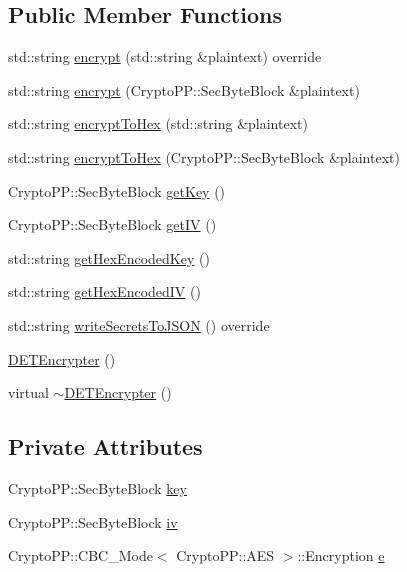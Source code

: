 \subsection*{Public Member Functions}
\begin{DoxyCompactItemize}
\item 
std\+::string \hyperlink{classDETEncrypter_a9d628bff7fe333ece3c39f3827727582}{encrypt} (std\+::string \&plaintext) override
\item 
std\+::string \hyperlink{classDETEncrypter_a0755264964442bb1593cf1ffd0bbe274}{encrypt} (Crypto\+P\+P\+::\+Sec\+Byte\+Block \&plaintext)
\item 
std\+::string \hyperlink{classDETEncrypter_ad688722b05535c623af3c32548af23c9}{encrypt\+To\+Hex} (std\+::string \&plaintext)
\item 
std\+::string \hyperlink{classDETEncrypter_a78128a4a9df72a4199abbd06f6169c48}{encrypt\+To\+Hex} (Crypto\+P\+P\+::\+Sec\+Byte\+Block \&plaintext)
\item 
Crypto\+P\+P\+::\+Sec\+Byte\+Block \hyperlink{classDETEncrypter_aa8b1e2a9a97067e338eaf5f4b6093db9}{get\+Key} ()
\item 
Crypto\+P\+P\+::\+Sec\+Byte\+Block \hyperlink{classDETEncrypter_a78968a6f219de6c9d08989898d954e30}{get\+IV} ()
\item 
std\+::string \hyperlink{classDETEncrypter_a79402704553f39cc751cc60c5ace53df}{get\+Hex\+Encoded\+Key} ()
\item 
std\+::string \hyperlink{classDETEncrypter_adebcf0d8c18e5b994a8f6cc3e29edff6}{get\+Hex\+Encoded\+IV} ()
\item 
std\+::string \hyperlink{classDETEncrypter_a30ffe8f94a95f723e62d0b1a1ed8dc56}{write\+Secrets\+To\+J\+S\+ON} () override
\item 
\hyperlink{classDETEncrypter_a11abdce8bc5cda79b1d3f20b940a99d1}{D\+E\+T\+Encrypter} ()
\item 
virtual \hyperlink{classDETEncrypter_a517bdbe6dfd178ebb66405faa9cfca55}{$\sim$\+D\+E\+T\+Encrypter} ()
\end{DoxyCompactItemize}
\subsection*{Private Attributes}
\begin{DoxyCompactItemize}
\item 
Crypto\+P\+P\+::\+Sec\+Byte\+Block \hyperlink{classDETEncrypter_a698a78e4f1fb49cf02a005ee7bce6a99}{key}
\item 
Crypto\+P\+P\+::\+Sec\+Byte\+Block \hyperlink{classDETEncrypter_a40e99abf751fa9c802b3a4cc9c6796a0}{iv}
\item 
Crypto\+P\+P\+::\+C\+B\+C\+\_\+\+Mode$<$ Crypto\+P\+P\+::\+A\+ES $>$\+::Encryption \hyperlink{classDETEncrypter_a29875af9a8c1df01802d11f0a00f5f90}{e}
\end{DoxyCompactItemize}



